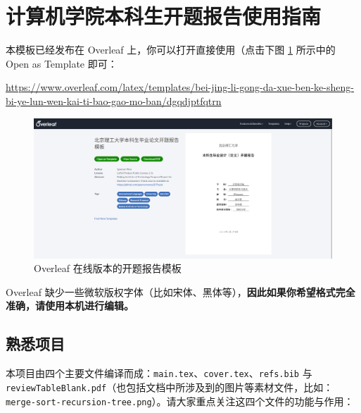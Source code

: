 \section{计算机学院本科生开题报告使用指南} \label{proposal}

本模板已经发布在 Overleaf 上，你可以打开直接使用（点击下图 \ref{overleaf-proposal} 所示中的 Open as Template 即可：

\begin{center}
  \color{ForestGreen}\href{https://www.overleaf.com/latex/templates/bei-jing-li-gong-da-xue-ben-ke-sheng-bi-ye-lun-wen-kai-ti-bao-gao-mo-ban/dgqdjptfqtrn}{https://www.overleaf.com/latex/templates/bei-jing-li-gong-da-xue-ben-ke-sheng-bi-ye-lun-wen-kai-ti-bao-gao-mo-ban/dgqdjptfqtrn}
\end{center}

\begin{figure}[H]
  \centering
  \includegraphics[width=\textwidth]{images/overleaf.png}
  \caption{Overleaf 在线版本的开题报告模板}
  \label{overleaf-proposal}
\end{figure}

Overleaf 缺少一些微软版权字体（比如宋体、黑体等），\textbf{因此如果你希望格式完全准确，请使用本机进行编辑。}

\subsection{熟悉项目}

本项目由四个主要文件编译而成：\texttt{main.tex}、\texttt{cover.tex}、\texttt{refs.bib} 与\\ \texttt{reviewTableBlank.pdf}（也包括文档中所涉及到的图片等素材文件，比如：\\ \texttt{merge-sort-recursion-tree.png}）。请大家重点关注这四个文件的功能与作用：

